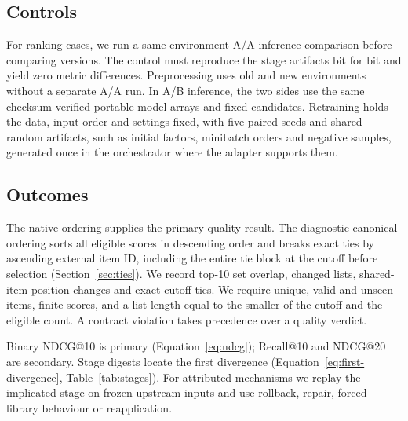 \documentclass[11pt,a4paper]{article}
\begin{document}
\subsection{Controls}
For ranking cases, we run a same-environment A/A inference comparison
before comparing versions. The control must reproduce the stage artifacts
bit for bit and yield zero metric differences. Preprocessing uses old and
new environments without a separate A/A run. In A/B inference, the two sides
use the same checksum-verified portable model arrays and fixed candidates.
Retraining holds the data, input order and settings fixed, with five paired
seeds and shared random artifacts, such as initial factors, minibatch orders
and negative samples, generated once in the orchestrator where the adapter
supports them.

\subsection{Outcomes}
The native ordering supplies the primary quality result. The diagnostic
canonical ordering sorts all eligible scores in descending order and breaks
exact ties by ascending external item ID, including the entire tie block at
the cutoff before selection (Section~\ref{sec:ties}). We record top-10 set
overlap, changed lists, shared-item position changes and exact cutoff ties.
We require unique, valid and unseen items, finite scores, and a list length
equal to the smaller of the cutoff and the eligible count. A contract
violation takes precedence over a quality verdict.

Binary NDCG@10 is primary (Equation~\ref{eq:ndcg}); Recall@10 and NDCG@20 are
secondary. Stage digests locate the first divergence
(Equation~\ref{eq:first-divergence}, Table~\ref{tab:stages}). For attributed
mechanisms we replay the implicated stage on frozen upstream inputs and use
rollback, repair, forced library behaviour or reapplication.
\end{document}

